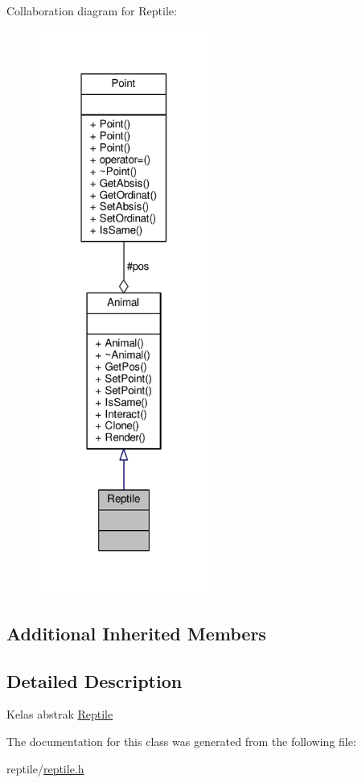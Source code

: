 Collaboration diagram for Reptile\+:
\nopagebreak
\begin{figure}[H]
\begin{center}
\leavevmode
\includegraphics[width=159pt]{classReptile__coll__graph}
\end{center}
\end{figure}
\subsection*{Additional Inherited Members}


\subsection{Detailed Description}
Kelas abstrak \hyperlink{classReptile}{Reptile} 

The documentation for this class was generated from the following file\+:\begin{DoxyCompactItemize}
\item 
reptile/\hyperlink{reptile_8h}{reptile.\+h}\end{DoxyCompactItemize}
